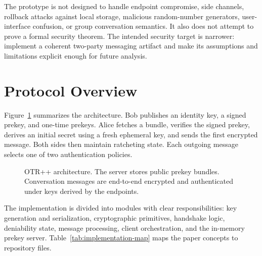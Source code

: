 \documentclass[11pt]{article}
\newcommand{\prot}{OTR++}
\begin{document}
The prototype is not designed to handle endpoint compromise, side channels, rollback attacks against local storage, malicious random-number generators, user-interface confusion, or group conversation semantics. It also does not attempt to prove a formal security theorem. The intended security target is narrower: implement a coherent two-party messaging artifact and make its assumptions and limitations explicit enough for future analysis.

\section{Protocol Overview}

Figure~\ref{fig:architecture} summarizes the architecture. Bob publishes an identity key, a signed prekey, and one-time prekeys. Alice fetches a bundle, verifies the signed prekey, derives an initial secret using a fresh ephemeral key, and sends the first encrypted message. Both sides then maintain ratcheting state. Each outgoing message selects one of two authentication policies.

\begin{figure}[t]
\centering
{}
\caption{\prot{} architecture. The server stores public prekey bundles. Conversation messages are end-to-end encrypted and authenticated under keys derived by the endpoints.}
\label{fig:architecture}
\end{figure}

The implementation is divided into modules with clear responsibilities: key generation and serialization, cryptographic primitives, handshake logic, deniability state, message processing, client orchestration, and the in-memory prekey server. Table~\ref{tab:implementation-map} maps the paper concepts to repository files.
\end{document}
